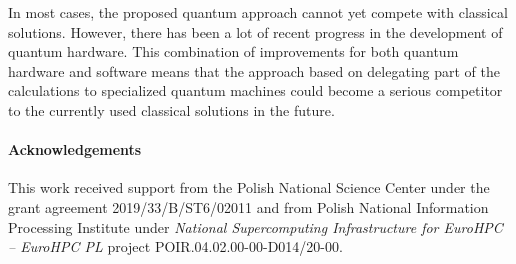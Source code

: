 \documentclass[a4paper,11pt]{article}
\begin{document}
In most cases, the proposed quantum approach cannot yet compete with classical solutions. However, there has been a lot of recent progress in the development of quantum hardware. This combination of improvements for both quantum hardware and software means that the approach based on delegating part of the calculations to specialized quantum machines could become a serious competitor to the currently used classical solutions in the future.



\paragraph{Acknowledgements}
This work received support from the Polish National Science Center under the grant agreement 2019/33/B/ST6/02011 and from Polish National Information Processing Institute  under \emph{National Supercomputing Infrastructure for EuroHPC -- EuroHPC PL} project POIR.04.02.00-00-D014/20-00.



\end{document}
